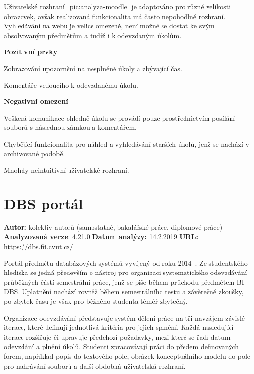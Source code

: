 Uživatelské rozhraní~\ref{pic:analyza-moodle} je adaptováno pro různé velikosti obrazovek, avšak realizovaná funkcionalita má často nepohodlné rozhraní. Vyhledávání na webu je velice omezené, není možné se dostat ke svým absolvovaným předmětům a tudíž i k odevzdaným úkolům.

\textbf{Pozitivní prvky}

\begin{ul}
   \item
   Zobrazování upozornění na nesplněné úkoly a zbývající čas.
   \item
   Komentáře vedoucího k odevzdanému úkolu.
\end{ul}

\textbf{Negativní omezení}

\begin{ul}
   \item
   Veškerá komunikace ohledně úkolu se provádí pouze prostřednictvím
   posílání souborů s následnou zámkou a komentářem.
   \item
   Chybějící funkcionalita pro náhled a vyhledávání starších úkolů, jenž
   se nachází v archivované podobě.
   \item
   Mnohdy neintuitivní uživatelské rozhraní.
\end{ul}




\section{DBS portál}

\textbf{Autor:} kolektiv autorů (samostatně, bakalářské práce, diplomové práce)\newline
\textbf{Analyzovaná verze:} 4.21.0\newline
\textbf{Datum analýzy:} 14.2.2019\newline
\textbf{URL:} https://dbs.fit.cvut.cz/

Portál předmětu databázových systémů vyvíjený od roku 2014~\cite{dbsAuthors}. Ze studentského hlediska se jedná především o nástroj pro organizaci systematického odevzdávání průběžných částí semestrální práce, jenž se píše během průchodu předmětem BI-DBS. Uplatnění nachází rovněž během semestrálního testu a závěrečné zkoušky, po zbytek času je však pro běžného studenta téměř zbytečný.

Organizace odevzdávání představuje systém dělení práce na tři navzájem závislé iterace, které definují jednotlivá kritéria pro jejich splnění. Každá následující iterace rozšiřuje či upravuje předchozí požadavky, mezi které se řadí datum odevzdání a plnění úkolů. Studenti zpracovávají práci do předem definovaných forem, například popis do textového pole, obrázek konceptuálního modelu do pole pro nahrávání souborů a další obdobná uživatelská rozhraní.

